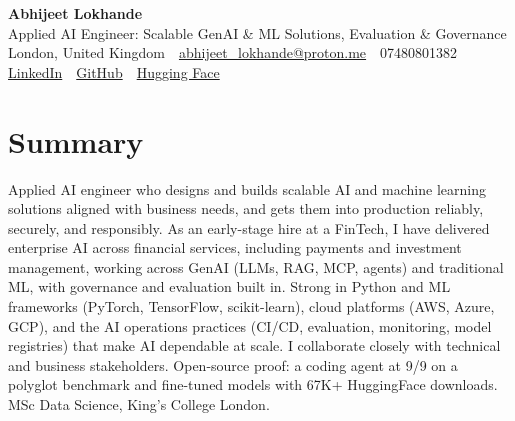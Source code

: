 \documentclass[10pt,a4paper]{article}
\newcommand{\sep}{\,\textcolor{accent!60}{\textbar}\,}
\begin{document}
\begin{center}
  {\fontsize{24}{26}\selectfont\bfseries Abhijeet Lokhande}\\[3pt]
  {\color{accent}\large Applied AI Engineer: Scalable GenAI \& ML Solutions, Evaluation \& Governance}\\[5pt]
  {\small
    London, United Kingdom \sep
    \href{mailto:abhijeet_lokhande@proton.me}{abhijeet\_lokhande@proton.me} \sep
    07480801382 \\[2pt]
    \href{https://www.linkedin.com/in/ablds/}{LinkedIn} \sep
    \href{https://github.com/abhijeetscode}{GitHub} \sep
    \href{https://huggingface.co/ab-ai}{Hugging Face}
  }
\end{center}
\vspace{2pt}

\section{Summary}
Applied AI engineer who designs and builds scalable AI and machine learning solutions aligned with business needs, and gets them into production reliably, securely, and responsibly. As an early-stage hire at a FinTech, I have delivered enterprise AI across financial services, including payments and investment management, working across GenAI (LLMs, RAG, MCP, agents) and traditional ML, with governance and evaluation built in. Strong in Python and ML frameworks (PyTorch, TensorFlow, scikit-learn), cloud platforms (AWS, Azure, GCP), and the AI operations practices (CI/CD, evaluation, monitoring, model registries) that make AI dependable at scale. I collaborate closely with technical and business stakeholders. Open-source proof: a coding agent at 9/9 on a polyglot benchmark and fine-tuned models with 67K+ HuggingFace downloads. MSc Data Science, King's College London.

\end{document}
